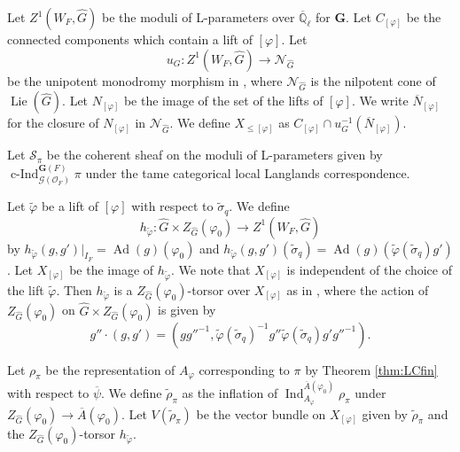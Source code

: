 \documentclass[12pt,a4paper]{article}
\DeclareMathOperator{\Ind}{Ind}
\DeclareMathOperator{\Lie}{Lie}
\DeclareMathOperator{\Ad}{Ad}
\DeclareMathOperator{\cInd}{c-Ind}
\newcommand{\mb}{\mathbb}
\newcommand{\mc}{\mathcal}
\newcommand{\mbf}{\mathbf}
\newcommand{\ol}{\overline}
\newcommand{\wh}{\widehat}
\begin{document}
Let $Z^1(W_F,\wh{G})$ be the moduli of L-parameters over $\ol{\mb{Q}}_{\ell}$ for $\mbf{G}$. 
Let $C_{[\varphi]}$ be the connected components which contain a lift of $[\varphi]$. 
Let 
\begin{equation*}
u_G \colon Z^1(W_F,\wh{G}) \to 
\mc{N}_{\wh{G}}
\end{equation*} 
be the unipotent monodromy morphism in \cite[VIII.2.1]{FaScGeomLLC}, 
where $\mc{N}_{\wh{G}}$ is the nilpotent cone of $\Lie (\wh{G})$.  
Let $N_{[\varphi]}$ be the image of the set of the lifts of $[\varphi]$. 
We write $\ol{N}_{[\varphi]}$ for the closure of $N_{[\varphi]}$ in $\mc{N}_{\wh{G}}$. 
We define $X_{\leq [\varphi]}$ as 
$C_{[\varphi]} \cap u_G^{-1} (\ol{N}_{[\varphi]})$. 


Let $\mc{S}_{\pi}$ be the coherent sheaf on the moduli of L-parameters given by 
$\cInd_{\mc{G}(\mc{O}_F)}^{\mbf{G}(F)} \pi$ 
under the tame categorical local Langlands correspondence. 

 
Let $\widetilde{\varphi}$ be a lift of $[\varphi]$ with respect to $\widetilde{\sigma}_q$. 
We define 
\begin{equation*}
h_{\widetilde{\varphi}} \colon \wh{G} \times Z_{\wh{G}} (\varphi_0) \to 
Z^1(W_F,\wh{G})
\end{equation*}
by 
$h_{\widetilde{\varphi}}(g,g')|_{I_F} =\Ad (g) (\varphi_0)$ 
and 
$h_{\widetilde{\varphi}}(g,g')(\widetilde{\sigma}_q)=\Ad (g)(\widetilde{\varphi}(\widetilde{\sigma}_q) g')$. 
Let $X_{[\varphi]}$ be the image of 
$h_{\widetilde{\varphi}}$. 
We note that $X_{[\varphi]}$ is independent of the choice of the lift $\widetilde{\varphi}$. 
Then $h_{\widetilde{\varphi}}$ is a 
$Z_{\wh{G}} (\varphi_0)$-torsor over 
$X_{[\varphi]}$ as in \cite[\S 2.3]{DHKMModLp}, 
where the action of $Z_{\wh{G}} (\varphi_0)$ on 
$\wh{G} \times Z_{\wh{G}} (\varphi_0)$ is given by 
\begin{equation*}
 g'' \cdot (g,g')=(gg''^{-1} , \widetilde{\varphi}(\widetilde{\sigma}_q)^{-1} g'' \widetilde{\varphi}(\widetilde{\sigma}_q) g' g''^{-1}). 
\end{equation*}

Let $\rho_{\pi}$ be the representation of $A_{\varphi}$ corresponding to $\pi$ by Theorem \ref{thm:LCfin} with respect to $\ol{\psi}$. 
We define $\widetilde{\rho}_{\pi}$ as the inflation of 
$\Ind_{A_{\varphi}}^{\ol{A}(\varphi_0)} \rho_{\pi}$ 
under $Z_{\wh{G}} (\varphi_0) \to \ol{A}(\varphi_0)$. 
Let $V(\widetilde{\rho}_{\pi})$ be the vector bundle on  $X_{[\varphi]}$ given by $\widetilde{\rho}_{\pi}$ and the $Z_{\wh{G}} (\varphi_0)$-torsor $h_{\widetilde{\varphi}}$. 
\end{document}

